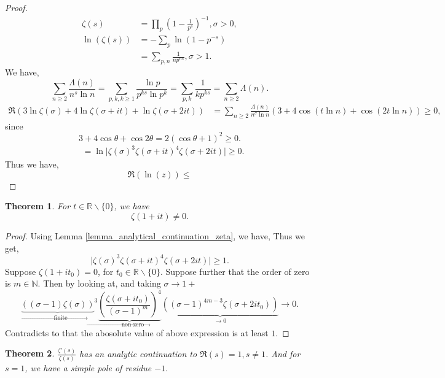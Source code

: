 \documentclass{article}
\newtheorem{theorem}{Theorem} [section]
\newcommand{\N}[0]{\mathbb{N}}
\newcommand{\R}[0]{\mathbb{R}}
\begin{document}
  \begin{proof}
    \begin{align*}
      \zeta(s) & = \prod_{p}\left( 1-{\frac 1 {p^s}}\right)^{-1},\sigma >0,\\
      \ln(\zeta(s))&=-\sum_{p}\ln(1-p^{-s})\\
      & = \sum_{p,n}{\frac 1 {np^{ns}}}, \sigma > 1.
    \end{align*}
    We have,
    \begin{equation*}
      \sum_{n\geq 2}{\frac {\Lambda(n)} {n^s\ln n}} = \sum_{p,k,k\geq 1}{\frac {\ln p} {p^{ks}\ln p^k}}= \sum_{p,k}{\frac 1 {kp^{ks}}} = \sum_{n\geq 2}{\Lambda(n)}.
    \end{equation*}
    \begin{align*}
      \Re(3\ln \zeta(\sigma)+4\ln\zeta(\sigma+it)+\ln\zeta(\sigma+2it)) & = \sum_{n\geq 2}{\frac {\Lambda(n)} {n^\sigma\ln n}}(3+4\cos(t\ln n)+\cos(2t\ln n))\geq 0,
    \end{align*}
   since 
    \begin{equation*}
      3+4\cos\theta+\cos 2\theta = 2(\cos\theta+1)^2\geq 0.
    \end{equation*}
    \begin{align*}
      & = \ln\vert\zeta(\sigma)^3\zeta(\sigma+it)^4\zeta(\sigma+2it)\vert \geq 0.
    \end{align*}
    Thus we have,
    \begin{equation*}
      \Re(\ln(z))\leq %
    \end{equation*}
  \end{proof}
  \begin{theorem}
    For $t\in\R\backslash\{0\}$, we have 
    \begin{equation*}
      \zeta(1+it)\not=0.
    \end{equation*}
    \label{theorem_non_vanishing_zeta_s_1}
  \end{theorem}
  \begin{proof}
    Using Lemma \ref{lemma_analytical_continuation_zeta}, we have,
    Thus we get, 
    \begin{equation*}
      \vert \zeta(\sigma)^3\zeta(\sigma+it)^4\zeta(\sigma+2it)\vert \geq 1.
    \end{equation*}
    Suppose $\zeta(1+it_0)=0$, for $t_0\in\R\backslash\{0\}$. Suppose further that the order of zero is $m\in\N$. Then by looking at, and taking $\sigma\to1+$
    \begin{equation*}
      {\underbrace{((\sigma-1)\zeta(\sigma))}_{\to\text{finite}}}^3\underbrace{\left({\frac {\zeta(\sigma+it_0)} {(\sigma-1)^m}}\right)^4}_{\to\text{non-zero}}\underbrace{((\sigma-1)^{4m-3}\zeta(\sigma+2it_0))}_{\to 0 }\to 0.
    \end{equation*}
    Contradicts to that the abosolute value of above expression is at least $1$.
  \end{proof}
  \begin{theorem}
  ${\frac {\zeta'(s)} {\zeta(s)}}$ has an analytic continuation to $\Re(s)=1,s\not=1$. And for $s=1$, we have a simple pole of residue $-1$.
  \label{thorem_zeta_zeta_derivatie_residue}
\end{theorem}
\end{document}
